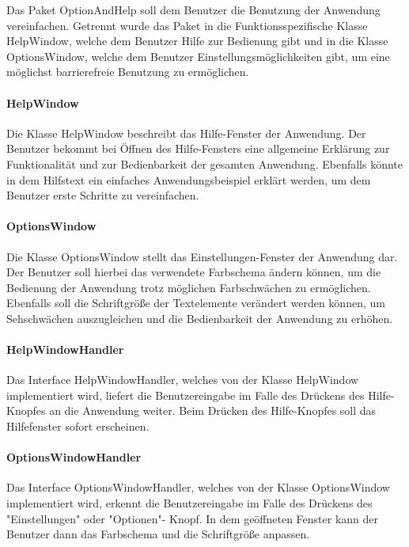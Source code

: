 \documentclass[parskip=full]{scrartcl}
\begin{document}
Das Paket OptionAndHelp soll dem Benutzer die Benutzung der Anwendung vereinfachen. Getrennt wurde das Paket in die Funktionsspezifische Klasse HelpWindow, welche dem Benutzer Hilfe zur Bedienung gibt und in die Klasse OptionsWindow, welche dem Benutzer Einstellungsmöglichkeiten gibt, um eine möglichst barrierefreie Benutzung zu ermöglichen.

\paragraph{HelpWindow}

Die Klasse HelpWindow beschreibt das Hilfe-Fenster der Anwendung. Der Benutzer bekommt bei Öffnen des Hilfe-Fensters eine allgemeine Erklärung zur Funktionalität und zur Bedienbarkeit der gesamten Anwendung. Ebenfalls könnte in dem Hilfstext ein einfaches Anwendungsbeispiel erklärt werden, um dem Benutzer erste Schritte zu vereinfachen.

\paragraph{OptionsWindow}

Die Klasse OptionsWindow stellt das Einstellungen-Fenster der Anwendung dar. Der Benutzer soll hierbei das verwendete Farbschema ändern können, um die Bedienung der Anwendung trotz möglichen Farbschwächen zu ermöglichen. Ebenfalls soll die Schriftgröße der Textelemente verändert werden können, um Sehschwächen auszugleichen und die Bedienbarkeit der Anwendung zu erhöhen. 

\paragraph{HelpWindowHandler}

Das Interface HelpWindowHandler, welches von der Klasse HelpWindow implementiert wird, liefert die Benutzereingabe im Falle des Drückens des Hilfe-Knopfes an die Anwendung weiter. Beim Drücken des Hilfe-Knopfes soll das Hilfefenster sofort erscheinen.

\paragraph{OptionsWindowHandler}

Das Interface OptionsWindowHandler, welches von der Klasse OptionsWindow implementiert wird, erkennt die Benutzereingabe im Falle des Drückens des "Einstellungen" oder "Optionen"- Knopf. In dem geöffneten Fenster kann der Benutzer dann das Farbschema und die Schriftgröße anpassen.
\end{document}
